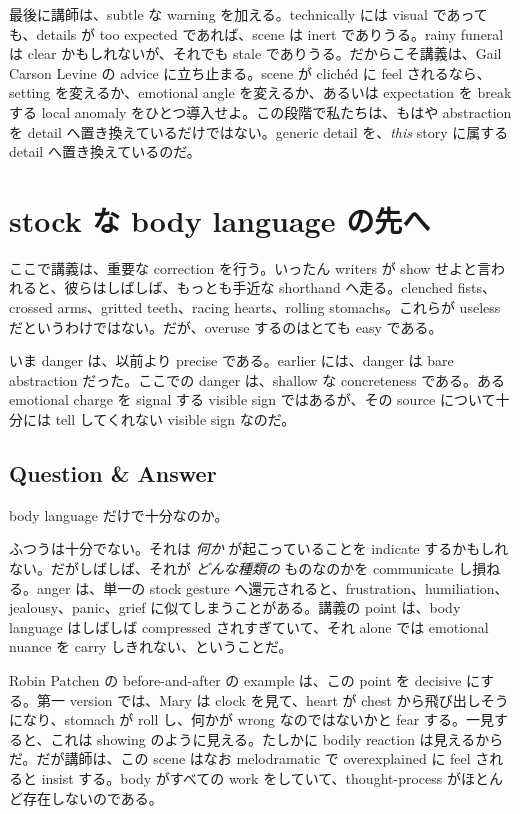 最後に講師は、subtle な warning を加える。technically には visual であっても、details が too expected であれば、scene は inert でありうる。rainy funeral は clear かもしれないが、それでも stale でありうる。だからこそ講義は、Gail Carson Levine の advice に立ち止まる。scene が clich\'ed に feel されるなら、setting を変えるか、emotional angle を変えるか、あるいは expectation を break する local anomaly をひとつ導入せよ。この段階で私たちは、もはや abstraction を detail へ置き換えているだけではない。generic detail を、\emph{this} story に属する detail へ置き換えているのだ。

\section{stock な body language の先へ}

ここで講義は、重要な correction を行う。いったん writers が show せよと言われると、彼らはしばしば、もっとも手近な shorthand へ走る。clenched fists、crossed arms、gritted teeth、racing hearts、rolling stomachs。これらが useless だというわけではない。だが、overuse するのはとても easy である。

いま danger は、以前より precise である。earlier には、danger は bare abstraction だった。ここでの danger は、shallow な concreteness である。ある emotional charge を signal する visible sign ではあるが、その source について十分には tell してくれない visible sign なのだ。

\subsection{Question \& Answer}

body language だけで十分なのか。

ふつうは十分でない。それは \emph{何か} が起こっていることを indicate するかもしれない。だがしばしば、それが \emph{どんな種類の} ものなのかを communicate し損ねる。anger は、単一の stock gesture へ還元されると、frustration、humiliation、jealousy、panic、grief に似てしまうことがある。講義の point は、body language はしばしば compressed されすぎていて、それ alone では emotional nuance を carry しきれない、ということだ。

Robin Patchen の before-and-after の example は、この point を decisive にする。第一 version では、Mary は clock を見て、heart が chest から飛び出しそうになり、stomach が roll し、何かが wrong なのではないかと fear する。一見すると、これは showing のように見える。たしかに bodily reaction は見えるからだ。だが講師は、この scene はなお melodramatic で overexplained に feel されると insist する。body がすべての work をしていて、thought-process がほとんど存在しないのである。

